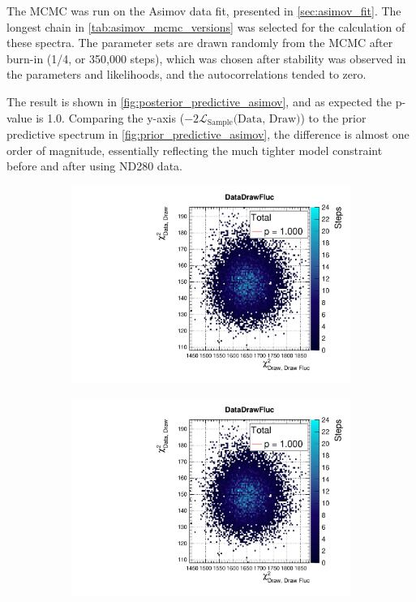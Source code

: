 The MCMC was run on the Asimov data fit, presented in \autoref{sec:asimov_fit}. The longest chain in \autoref{tab:asimov_mcmc_versions} was selected for the calculation of these spectra. The parameter sets are drawn randomly from the MCMC after burn-in (1/4, or 350,000 steps), which was chosen after stability was observed in the parameters and likelihoods, and the autocorrelations tended to zero. 

The result is shown in \autoref{fig:posterior_predictive_asimov}, and as expected the p-value is 1.0. Comparing the y-axis ($-2\mathcal{L}_{\text{Sample}} \text{(Data, Draw)}$) to the prior predictive spectrum in \autoref{fig:prior_predictive_asimov}, the difference is almost one order of magnitude, essentially reflecting the much tighter model constraint before and after using ND280 data.
\begin{figure}[h]
	\begin{subfigure}[t]{0.49\textwidth}
		\includegraphics[width=\textwidth, trim={0mm 0mm 0mm 11mm}, clip,page=1]{figures/mach3/Asimov/2017b_NewDet_3Xsec_4Det_5Flux_NewXSecTune_Asimov_merge_PostPred_procs}
	\end{subfigure}
	\begin{subfigure}[t]{0.49\textwidth}
		\includegraphics[width=\textwidth, trim={0mm 0mm 0mm 11mm}, clip,page=2]{figures/mach3/Asimov/2017b_NewDet_3Xsec_4Det_5Flux_NewXSecTune_Asimov_merge_PostPred_procs}

\end{subfigure}
\end{figure}

